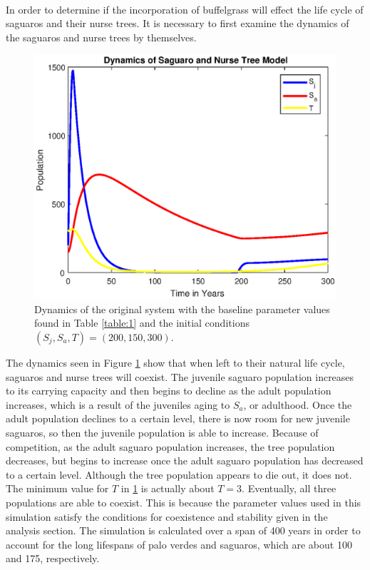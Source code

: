 \documentclass[a4paper]{article}
\begin{document}
\paragraph{}
In order to determine if the incorporation of buffelgrass will effect the life cycle of saguaros and their nurse trees. It is necessary to first examine the dynamics of the saguaros and nurse trees by themselves.
\begin{figure}[H]
\begin{center}
\includegraphics[scale = 0.7]{original_200_150_300.eps}
\caption{Dynamics of the original system with the baseline parameter values found in Table \ref{table:1} and the initial conditions $(S_j, S_a, T) = (200,150,300)$.}
\label{fig:original}
\end{center}
\end{figure}
The dynamics seen in Figure \ref{fig:original} show that when left to their natural life cycle, saguaros and nurse trees will coexist. The juvenile saguaro population increases to its carrying capacity and then begins to decline as the adult population increases, which is a result of the juveniles aging to $S_a$, or adulthood. Once the adult population declines to a certain level, there is now room for new juvenile saguaros, so then the juvenile population is able to increase. Because of competition, as the adult saguaro population increases, the tree population decreases, but begins to increase once the adult saguaro population has decreased to a certain level. Although the tree population appears to die out, it does not. The minimum value for $T$ in \ref{fig:original} is actually about $T = 3$. Eventually, all three populations are able to coexist. This is because the parameter values used in this simulation satisfy the conditions for coexistence and stability given in the analysis section. The simulation is calculated over a span of 400 years in order to account for the long lifespans of palo verdes and saguaros, which are about 100 and 175, respectively.\\
\end{document}
